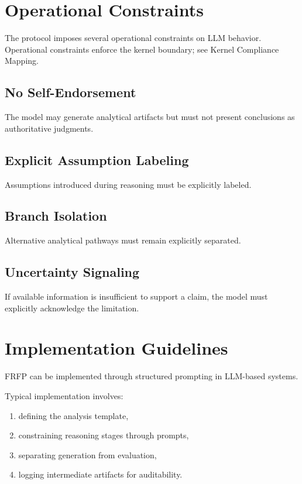 \section{Operational Constraints}

The protocol imposes several operational constraints on LLM behavior. Operational constraints enforce the kernel boundary; see Kernel Compliance Mapping.

\subsection{No Self-Endorsement}

The model may generate analytical artifacts but must not present conclusions as authoritative judgments.

\subsection{Explicit Assumption Labeling}

Assumptions introduced during reasoning must be explicitly labeled.

\subsection{Branch Isolation}

Alternative analytical pathways must remain explicitly separated.

\subsection{Uncertainty Signaling}

If available information is insufficient to support a claim, the model must explicitly acknowledge the limitation.

\section{Implementation Guidelines}

FRFP can be implemented through structured prompting in LLM-based systems.

Typical implementation involves:

\begin{enumerate}
\item defining the analysis template,
\item constraining reasoning stages through prompts,
\item separating generation from evaluation,
\item logging intermediate artifacts for auditability.
\end{enumerate}

